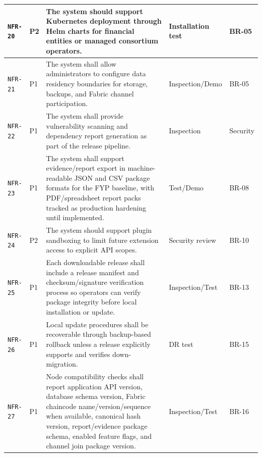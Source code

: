 \documentclass[11pt,a4paper]{article}
\begin{document}
\begin{footnotesize}
\begin{longtable}{@{}p{}p{}p{}p{}p{}@{}}
\texttt{NFR-20} & P2 & The system should support Kubernetes deployment through Helm charts for financial entities or managed consortium operators. & Installation test & BR-05 \\ \hline
\texttt{NFR-21} & P1 & The system shall allow administrators to configure data residency boundaries for storage, backups, and Fabric channel participation. & Inspection/Demo & BR-05 \\ \hline
\texttt{NFR-22} & P1 & The system shall provide vulnerability scanning and dependency report generation as part of the release pipeline. & Inspection & Security \\ \hline
\texttt{NFR-23} & P1 & The system shall support evidence/report export in machine-readable JSON and CSV package formats for the FYP baseline, with PDF/spreadsheet report packs tracked as production hardening until implemented. & Test/Demo & BR-08 \\ \hline
\texttt{NFR-24} & P2 & The system should support plugin sandboxing to limit future extension access to explicit API scopes. & Security review & BR-10 \\ \hline
\texttt{NFR-25} & P1 & Each downloadable release shall include a release manifest and checksum/signature verification process so operators can verify package integrity before local installation or update. & Inspection/Test & BR-13 \\ \hline
\texttt{NFR-26} & P1 & Local update procedures shall be recoverable through backup-based rollback unless a release explicitly supports and verifies down-migration. & DR test & BR-15 \\ \hline
\texttt{NFR-27} & P1 & Node compatibility checks shall report application API version, database schema version, Fabric chaincode name/version/sequence when available, canonical hash version, report/evidence package schema, enabled feature flags, and channel join package version. & Inspection/Test & BR-16 \\ \hline
\end{longtable}
\end{footnotesize}
\end{document}
